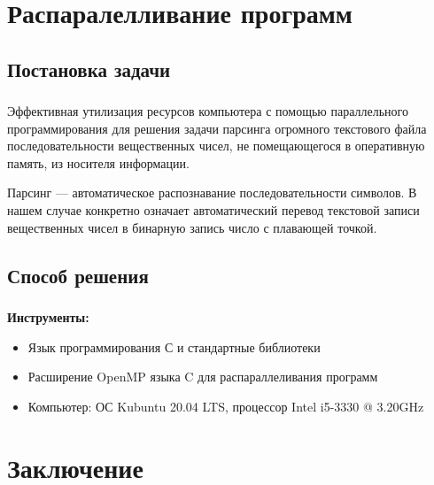 \section{Распаралелливание программ}


\subsection{Постановка задачи}
\begin{frame}
\frametitle{\insertsection}
\framesubtitle{\insertsubsection}

Эффективная утилизация ресурсов компьютера с помощью параллельного программирования
для решения задачи парсинга огромного текстового файла последовательности вещественных чисел,
не помещающегося в оперативную память, из носителя информации.

Парсинг --- автоматическое распознавание последовательности символов.
В нашем случае конкретно означает автоматический перевод текстовой записи вещественных чисел
в бинарную запись число с плавающей точкой.
\end{frame}


\subsection{Способ решения}


\begin{frame}
\frametitle{\insertsection}
\framesubtitle{\insertsubsection}

\textbf{Инструменты:}
\begin{itemize}
    \item Язык программирования С и стандартные библиотеки
    \item Расширение OpenMP языка C для распараллеливания программ 
    \item Компьютер: ОС Kubuntu 20.04 LTS, процессор  Intel i5-3330 @ 3.20GHz
\end{itemize}
\end{frame}


\section{Заключение}

